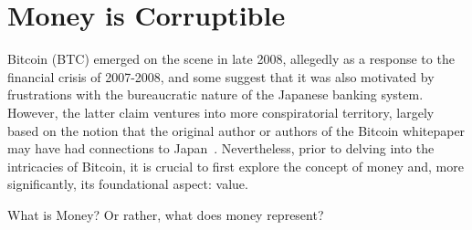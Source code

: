 \section{Money is Corruptible}
Bitcoin (BTC) emerged on the scene in late 2008, allegedly as a response to the financial crisis of 2007-2008, and some suggest that it was also motivated
by frustrations with the bureaucratic nature of the Japanese banking system. However, the latter claim ventures into more conspiratorial territory, largely
based on the notion that the original author or authors of the Bitcoin whitepaper may have had connections to Japan~\cite{nakamoto2008bitcoin}. Nevertheless,
prior to delving into the intricacies of Bitcoin, it is crucial to first explore the concept of money and, more significantly, its foundational aspect:
value.

What is Money? Or rather, what does money represent?



